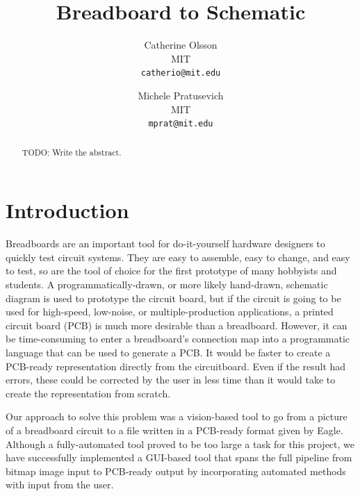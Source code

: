 \documentclass[10pt,twocolumn,letterpaper]{article}
\begin{document}
\title{Breadboard to Schematic}

\author{Catherine Olsson \\
MIT\\
{\tt\small catherio@mit.edu}
\and
Michele Pratusevich\\
MIT\\
{\tt\small mprat@mit.edu}
}

\maketitle
\thispagestyle{empty}

\begin{abstract}

TODO: Write the abstract.

\end{abstract}

\section{Introduction}

Breadboards are an important tool for do-it-yourself hardware
designers to quickly test circuit systems. They are easy to assemble,
easy to change, and easy to test, so are the tool of choice for the
first prototype of many hobbyists and students. A
programmatically-drawn, or more likely hand-drawn, schematic diagram
is used to prototype the circuit board, but if the circuit is going to
be used for high-speed, low-noise, or multiple-production
applications, a printed circuit board (PCB) is much more desirable
than a breadboard. However, it can be time-consuming to enter a
breadboard's connection map into a programmatic language that can be
used to generate a PCB. It would be faster to create a PCB-ready
representation directly from the circuitboard. Even if the result had
errors, these could be corrected by the user in less time than it
would take to create the representation from scratch.

Our approach to solve this problem was a vision-based tool to
go from a picture of a breadboard circuit to a file written in a
PCB-ready format given by Eagle. Although a fully-automated tool
proved to be too large a task for this project, we have successfully
implemented a GUI-based tool that spans the full pipeline from
bitmap image input to PCB-ready output by incorporating automated
methods with input from the user.
\end{document}
